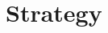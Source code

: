 \documentclass[Master.tex]{subfiles}
\begin{document}
	

\section{Strategy}\label{sec:Strategy}
    


%     
%
%     
\end{document}
